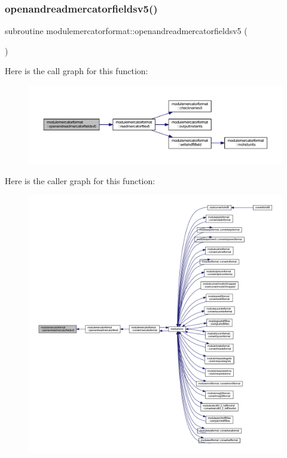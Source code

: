 \subsubsection{\texorpdfstring{openandreadmercatorfieldsv5()}{openandreadmercatorfieldsv5()}}
{\footnotesize\ttfamily subroutine modulemercatorformat\+::openandreadmercatorfieldsv5 (\begin{DoxyParamCaption}{ }\end{DoxyParamCaption})\hspace{0.3cm}{\ttfamily [private]}}

Here is the call graph for this function\+:\nopagebreak
\begin{figure}[H]
\begin{center}
\leavevmode
\includegraphics[width=350pt]{namespacemodulemercatorformat_afe37149b201bad497334d96a671ed27c_cgraph}
\end{center}
\end{figure}
Here is the caller graph for this function\+:\nopagebreak
\begin{figure}[H]
\begin{center}
\leavevmode
\includegraphics[width=350pt]{namespacemodulemercatorformat_afe37149b201bad497334d96a671ed27c_icgraph}
\end{center}
\end{figure}
\mbox{\label{namespacemodulemercatorformat_a4cccec2de301fe19e324230b88faa275}} 
